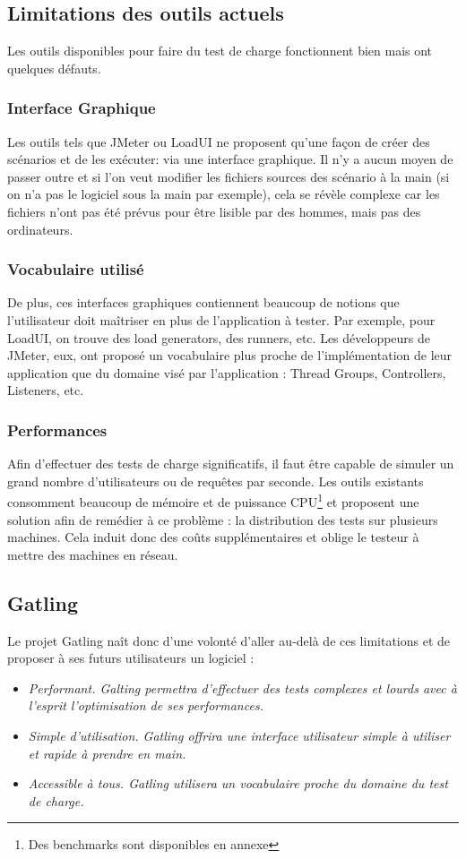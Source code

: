 \subsection{Limitations des outils actuels}
Les outils disponibles pour faire du test de charge fonctionnent bien mais ont quelques défauts.
\subsubsection{Interface Graphique}
Les outils tels que JMeter ou LoadUI ne proposent qu'une façon de créer des scénarios et de les exécuter: via une interface graphique. Il n'y a aucun moyen de passer outre et si l'on veut modifier les fichiers sources des scénario à la main (si on n'a pas le logiciel sous la main par exemple), cela se révèle complexe car les fichiers n'ont pas été prévus pour être lisible par des hommes, mais pas des ordinateurs.

\subsubsection{Vocabulaire utilisé}
De plus, ces interfaces graphiques contiennent beaucoup de notions que l'utilisateur doit maîtriser en plus de l'application à tester. Par exemple, pour LoadUI, on trouve des load generators, des runners, etc. Les développeurs de JMeter, eux, ont proposé un vocabulaire plus proche de l'implémentation de leur application que du domaine visé par l'application : Thread Groups, Controllers, Listeners, etc.

\subsubsection{Performances}
\label{pb_perfs}
Afin d'effectuer des tests de charge significatifs, il faut être capable de simuler un grand nombre d'utilisateurs ou de requêtes par seconde. Les outils existants consomment beaucoup de mémoire et de puissance CPU\footnote{Des benchmarks sont disponibles en annexe} et proposent une solution afin de remédier à ce problème : la distribution des tests sur plusieurs machines. Cela induit donc des coûts supplémentaires et oblige le testeur à mettre des machines en réseau.

\subsection{Gatling}
Le projet Gatling naît donc d'une volonté d'aller au-delà de ces limitations et de proposer à ses futurs utilisateurs un logiciel :
\begin{itemize}
  \item \em{Performant}. Galting permettra d'effectuer des tests complexes et lourds avec à l'esprit l'optimisation de ses performances.
  \item \em{Simple d'utilisation}. Gatling offrira une interface utilisateur simple à utiliser et rapide à prendre en main.
  \item \em{Accessible à tous}. Gatling utilisera un vocabulaire proche du domaine du test de charge.
\end{itemize}
